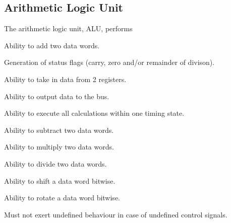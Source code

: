 \subsection{Arithmetic Logic Unit}
The arithmetic logic unit, ALU, performs



\begin{turing-requirement}
  Ability to add two data words.
\end{turing-requirement}

\begin{turing-requirement}
  Generation of status flags (carry, zero and/or remainder of divison). 
\end{turing-requirement}

\begin{arch-requirement}
  Ability to take in data from 2 registers.
\end{arch-requirement}

\begin{arch-requirement}
  Ability to output data to the bus. 
\end{arch-requirement}

\begin{arch-requirement}
  Ability to execute all calculations within one timing state.
\end{arch-requirement}

\begin{feat-requirement}
  Ability to subtract two data words.
\end{feat-requirement}

\begin{feat-requirement}
  Ability to multiply two data words.
\end{feat-requirement}

\begin{feat-requirement}
  Ability to divide two data words.
\end{feat-requirement}

\begin{feat-requirement}
  Ability to shift a data word bitwise.
\end{feat-requirement}

\begin{feat-requirement}
  Ability to rotate a data word bitwise.
\end{feat-requirement}

\begin{feat-requirement}
  Must not exert undefined behaviour in case of undefined control signals. 
\end{feat-requirement}

